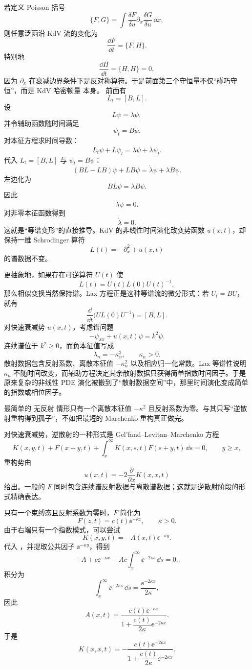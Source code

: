若定义 Poisson 括号
\[
\{F,G\}
=\int\frac{\delta F}{\delta u}
\partial_x\frac{\delta G}{\delta u}\,\dd x,
\]
则任意泛函沿 KdV 流的变化为
\[
\frac{\dd F}{\dd t}=\{F,H\}.
\]
特别地
\[
\frac{\dd H}{\dd t}=\{H,H\}=0,
\]
因为 $\partial_x$ 在衰减边界条件下是反对称算符。于是前面第三个守恒量不仅“碰巧守恒”，而是 KdV 哈密顿量 本身。
前面有
\[
L_t=[B,L].
\]
设
\[
L\psi=\lambda\psi,
\]
并令辅助函数随时间满足
\[
\psi_t=B\psi.
\]
对本征方程求时间导数：
\[
L_t\psi+L\psi_t
=\dot\lambda\psi+\lambda\psi_t.
\]
代入 $L_t=[B,L]$ 与 $\psi_t=B\psi$：
\[
(BL-LB)\psi+LB\psi
=\dot\lambda\psi+\lambda B\psi.
\]
左边化为
\[
BL\psi=\lambda B\psi.
\]
因此
\[
\dot\lambda\psi=0.
\]
对非零本征函数得到
\begin{equation*}{\dot\lambda=0}.\end{equation*}
这就是“等谱变形”的直接推导。KdV 的非线性时间演化改变势函数 $u(x,t)$，却保持一维 Schrodinger 算符
\[
L(t)=-\partial_x^2+u(x,t)
\]
的谱数据不变。

更抽象地，如果存在可逆算符 $U(t)$ 使
\[
L(t)=U(t)L(0)U(t)^{-1},
\]
那么相似变换当然保持谱。Lax 方程正是这种等谱流的微分形式：若 $U_t=BU$，就有
\[
\frac{\dd}{\dd t}
\bigl(UL(0)U^{-1}\bigr)
=[B,L].
\]
对快速衰减势 $u(x,t)$，考虑谱问题
\[
-\psi_{xx}+u(x,t)\psi=k^2\psi.
\]
连续谱位于 $k^2\ge0$，而负本征值写成
\[
\lambda_n=-\kappa_n^2,
\qquad \kappa_n>0.
\]
散射数据包含反射系数、离散本征值 $-\kappa_n^2$ 以及相应归一化常数。Lax 等谱性说明 $\kappa_n$ 不随时间改变，而辅助方程决定其余散射数据只获得简单指数时间因子。于是原来复杂的非线性 PDE 演化被搬到了``散射数据空间''中，那里时间演化变成简单的指数或相位因子。

最简单的 无反射 情形只有一个离散本征值 $-\kappa^2$ 且反射系数为零。与其只写“逆散射重构得到孤子”，不如把最短的 Marchenko 重构真正做完。

对快速衰减势，逆散射的一种形式是 Gel'fand--Levitan--Marchenko 方程
\begin{equation}
K(x,y,t)+F(x+y,t)
+\int_x^\infty K(x,s,t)F(s+y,t)\,\dd s=0,
\qquad y\ge x,
\label{eq:glm-marchenko}
\end{equation}
重构势由
\begin{equation}
{
 u(x,t)=-2\frac{\partial}{\partial x}K(x,x,t)
}
\label{eq:marchenko-potential-reconstruction}
\end{equation}
给出。一般的 $F$ 同时包含连续谱反射数据与离散谱数据；这就是逆散射阶段的形式精确表达。

只有一个束缚态且反射系数为零时，$F$ 简化为
\[
F(z,t)=c(t)\ee^{-\kappa z},
\qquad \kappa>0.
\]
由于右端只有一个指数模式，可以尝试
\[
K(x,y,t)=-A(x,t)\ee^{-\kappa y}.
\]
代入 ，并提取公共因子 $\ee^{-\kappa y}$，得到
\[
-A+c\ee^{-\kappa x}
-Ac\int_x^\infty\ee^{-2\kappa s}\,\dd s=0.
\]
积分为
\[
\int_x^\infty\ee^{-2\kappa s}\,\dd s
=\frac{\ee^{-2\kappa x}}{2\kappa},
\]
因此
\[
A(x,t)
=\frac{c(t)\ee^{-\kappa x}}
{1+\dfrac{c(t)}{2\kappa}\ee^{-2\kappa x}}.
\]
于是
\begin{equation*}K(x,x,t)
=-\frac{c(t)\ee^{-2\kappa x}}
{1+\dfrac{c(t)}{2\kappa}\ee^{-2\kappa x}}.\end{equation*}

